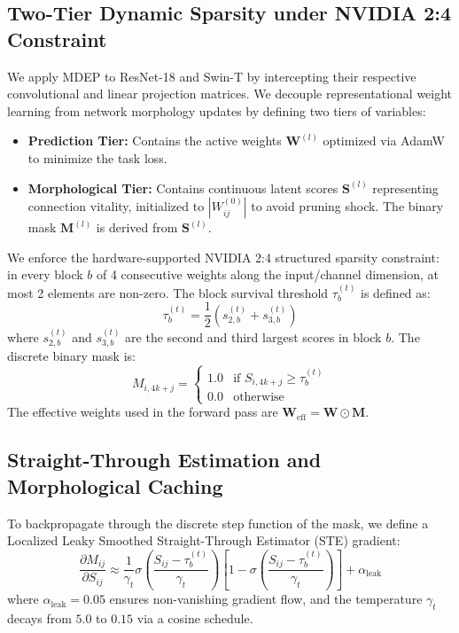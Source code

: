 \documentclass[letterpaper]{article} %
\begin{document}
\subsection{Two-Tier Dynamic Sparsity under NVIDIA 2:4 Constraint}
We apply MDEP to ResNet-18 and Swin-T by intercepting their respective convolutional and linear projection matrices. We decouple representational weight learning from network morphology updates by defining two tiers of variables:
\begin{itemize}
    \item \textbf{Prediction Tier:} Contains the active weights $\bm{W}^{(l)}$ optimized via AdamW to minimize the task loss.
    \item \textbf{Morphological Tier:} Contains continuous latent scores $\bm{S}^{(l)}$ representing connection vitality, initialized to $|W_{ij}^{(0)}|$ to avoid pruning shock. The binary mask $\bm{M}^{(l)}$ is derived from $\bm{S}^{(l)}$.
\end{itemize}
We enforce the hardware-supported NVIDIA 2:4 structured sparsity constraint: in every block $b$ of 4 consecutive weights along the input/channel dimension, at most 2 elements are non-zero. The block survival threshold $\tau_b^{(t)}$ is defined as:
\begin{equation}\label{eq:tau}
    \tau_b^{(t)} = \frac{1}{2} \left(s_{2,b}^{(t)} + s_{3,b}^{(t)}\right)
\end{equation}
where $s_{2,b}^{(t)}$ and $s_{3,b}^{(t)}$ are the second and third largest scores in block $b$. The discrete binary mask is:
\begin{equation}\label{eq:mask}
    M_{i, 4k+j} = \begin{cases}
        1.0 & \text{if } S_{i, 4k+j} \ge \tau_b^{(t)} \\
        0.0 & \text{otherwise}
    \end{cases}
\end{equation}
The effective weights used in the forward pass are $\bm{W}_{\text{eff}} = \bm{W} \odot \bm{M}$.

\subsection{Straight-Through Estimation and Morphological Caching}
To backpropagate through the discrete step function of the mask, we define a Localized Leaky Smoothed Straight-Through Estimator (STE) gradient:
\begin{equation}\label{eq:ste_grad}
    \frac{\partial M_{ij}}{\partial S_{ij}} \approx \frac{1}{\gamma_t} \sigma\!\left(\frac{S_{ij} - \tau_b^{(t)}}{\gamma_t}\right) \left[1 - \sigma\!\left(\frac{S_{ij} - \tau_b^{(t)}}{\gamma_t}\right)\right] + \alpha_{\text{leak}}
\end{equation}
where $\alpha_{\text{leak}} = 0.05$ ensures non-vanishing gradient flow, and the temperature $\gamma_t$ decays from $5.0$ to $0.15$ via a cosine schedule.
\end{document}
